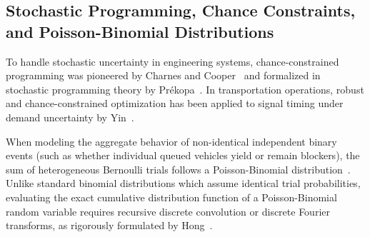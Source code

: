 \documentclass[journal,10pt,twocolumn]{IEEEtran}
\begin{document}
\subsection{Stochastic Programming, Chance Constraints, and Poisson-Binomial Distributions}
To handle stochastic uncertainty in engineering systems, chance-constrained programming was pioneered by Charnes and Cooper~\cite{charnes1959chance} and formalized in stochastic programming theory by Pr\'ekopa~\cite{prekopa1995stochastic}. In transportation operations, robust and chance-constrained optimization has been applied to signal timing under demand uncertainty by Yin~\cite{yin2008robust}.

When modeling the aggregate behavior of non-identical independent binary events (such as whether individual queued vehicles yield or remain blockers), the sum of heterogeneous Bernoulli trials follows a Poisson-Binomial distribution~\cite{chen1993poisson,barlow1984reliability}. Unlike standard binomial distributions which assume identical trial probabilities, evaluating the exact cumulative distribution function of a Poisson-Binomial random variable requires recursive discrete convolution or discrete Fourier transforms, as rigorously formulated by Hong~\cite{hong2013}.
\end{document}
